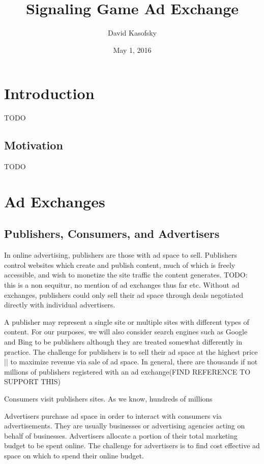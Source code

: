 \documentclass{article}
\title{Signaling Game Ad Exchange}
\author{David Kasofsky}
\date{May 1, 2016}
\begin{document}
\maketitle

\newpage

\tableofcontents

\newpage

\section{Introduction}

TODO

\subsection{Motivation}

TODO

\newpage

\section{Ad Exchanges}

\subsection{Publishers, Consumers, and Advertisers}

In online advertising, publishers are those with ad space to sell. Publishers control websites which create and publish content, much of which is freely accessible, and wish to monetize the site traffic the content generates. TODO: this is a non sequitur, no mention of ad exchanges thus far etc. Without ad exchanges, publishers could only sell their ad space through deals negotiated directly with individual advertisers.

A publisher may represent a single site or multiple sites with different types of content. For our purposes, we will also consider search engines such as Google and Bing to be publishers although they are treated somewhat differently in practice. The challenge for publishers is to sell their ad space at the highest price || to maximize revenue via sale of ad space. In general, there are thousands if not millions of publishers registered with an ad exchange(FIND REFERENCE TO SUPPORT THIS)

Consumers visit publishers sites. As we know, hundreds of millions 

Advertisers purchase ad space in order to interact with consumers via advertisements. They are usually businesses or advertising agencies acting on behalf of businesses. Advertisers allocate a portion of their total marketing budget to be spent online. The challenge for advertisers is to find cost effective ad space on which to spend their online budget. 
\end{document}
